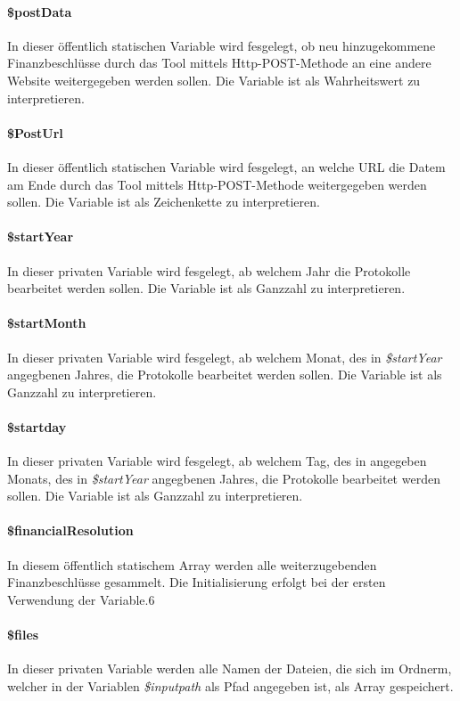 \documentclass[12pt,parskip=full, pagea4]{scrreprt}
\begin{document}
	\paragraph{\$postData} In dieser öffentlich statischen Variable wird fesgelegt, ob neu hinzugekommene Finanzbeschlüsse durch das Tool mittels Http-POST-Methode an eine andere Website weitergegeben werden sollen. Die Variable ist als Wahrheitswert zu interpretieren.
	
	\paragraph{\$PostUrl} In dieser öffentlich statischen Variable wird fesgelegt, an welche URL die Datem am Ende durch das Tool mittels Http-POST-Methode weitergegeben werden sollen. Die Variable ist als Zeichenkette zu interpretieren.
	
	\paragraph{\$startYear} In dieser privaten Variable wird fesgelegt, ab welchem Jahr die Protokolle bearbeitet werden sollen. Die Variable ist als Ganzzahl zu interpretieren.
	
	\paragraph{\$startMonth} In dieser privaten Variable wird fesgelegt, ab welchem Monat, des in \textit{\$startYear} angegbenen Jahres, die Protokolle bearbeitet werden sollen. Die Variable ist als Ganzzahl zu interpretieren.
	
	\paragraph{\$startday} In dieser privaten Variable wird fesgelegt, ab welchem Tag, des in  angegeben Monats, des in \textit{\$startYear} angegbenen Jahres, die Protokolle bearbeitet werden sollen. Die Variable ist als Ganzzahl zu interpretieren.
	
	\paragraph{\$financialResolution} In diesem öffentlich statischem Array werden alle weiterzugebenden Finanzbeschlüsse gesammelt. Die Initialisierung erfolgt bei der ersten Verwendung der Variable.6
	
	\paragraph{\$files} In dieser privaten Variable werden alle Namen der Dateien, die sich im Ordnerm, welcher in der Variablen \textit{\$inputpath} als Pfad angegeben ist, als Array gespeichert.
	
\end{document}
